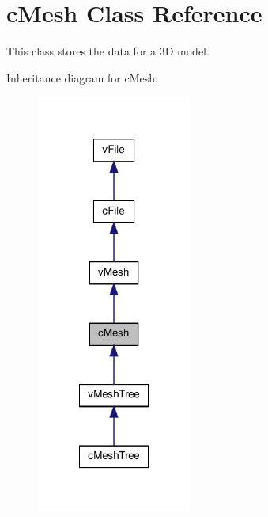 \hypertarget{classc_mesh}{
\section{cMesh Class Reference}
\label{classc_mesh}
}


This class stores the data for a 3D model.  




Inheritance diagram for cMesh:
\nopagebreak
\begin{figure}[H]
\begin{center}
\leavevmode
\includegraphics[width=144pt]{classc_mesh__inherit__graph}
\end{center}
\end{figure}


